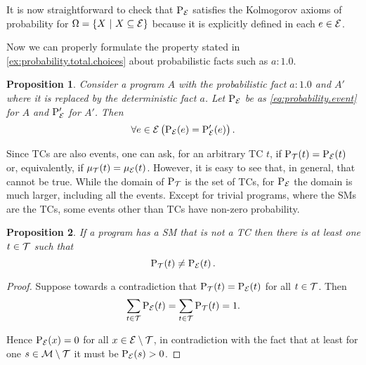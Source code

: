 \documentclass{tlp}
\newtheorem{proposition}{Proposition}
\newcommand{\at}[1]{\ensuremath{\!\del{#1}}}        %
\newcommand{\cla}[1]{\ensuremath{{\cal #1}}}        %
\newcommand{\TCHOICEset}{\ensuremath{\cla{T}}}
\newcommand{\MODELset}{\ensuremath{\cla{M}}}
\newcommand{\EVENTSset}{\ensuremath{\cla{E}}}
\newcommand{\prfunc}{\ensuremath{\mathrm{P}}}
\newcommand{\prd}[1]{\ensuremath{\prfunc_{#1}}}
\newcommand{\prT}{\prd{\TCHOICEset}}
\newcommand{\prE}{\prd{\EVENTSset}}
\newcommand{\pwT}{\ensuremath{\mu_{\TCHOICEset}}}
\newcommand{\pwt}[1]{\ensuremath{\pwT\at{#1}}}
\newcommand{\pwE}{\ensuremath{\mu_{\EVENTSset}}}
\newcommand{\pwe}[1]{\ensuremath{\pwE\at{#1}}}
\newcommand{\given}{\ensuremath{~\middle|~}}
\newcommand{\probfact}[2]{\ensuremath{#1:#2}}
\newcommand{\franc}[1]{{\color{green!30!black}#1}}
\begin{document}
It is now straightforward to check that \(\prE\) satisfies the
Kolmogorov axioms of probability for
\(\Omega = \set{X \given X \subseteq \EVENTSset}\) because it is
explicitly defined in each \(e\in\EVENTSset\).

\franc{ Now we can properly formulate the property stated in
  \cref{ex:probability.total.choices} about probabilistic facts such
  as \(\probfact{a}{1.0}\).
    \begin{proposition}\label{prop:prob.one}
        Consider a program $A$ with the probabilistic fact \(\probfact{a}{1.0}\) and $A'$ where it is replaced by the deterministic fact \(a\).  Let \(\prE\) be as \cref{eq:probability.event} for $A$ and \(\prfunc'_{\EVENTSset}\) for $A'$.  Then
        \begin{equation}
            \forall e \in \EVENTSset \left(\prE\at{e} = \prfunc'_{\EVENTSset}\at{e}\right).
        \end{equation}
    \end{proposition}
}

Since \aclp{TC} are also events, one can ask, for an arbitrary
\acl{TC} \(t\), if \(\prT\at{t} = \prE\at{t}\) or, equivalently, if
\(\pwt{t} = \pwe{t}\).  However, it is easy to see that, in general,
that cannot be true.  While the domain of \(\prT\) is the set of
\aclp{TC}, for \(\prE\) the domain is much larger, including all the
events.  Except for trivial programs, where the \acp{SM} are the
\acp{TC}, some events other than \aclp{TC} have non-zero probability.

\begin{proposition} \label{prop:two.distributions} %
    If a program has a \acl{SM} that is not a \acl{TC} then there is at least one \(t\in\TCHOICEset\) such that
    \begin{equation}
        \prT\at{t} \not= \prE\at{t}. \label{eq:two.distributions}
    \end{equation}
\end{proposition}

\begin{proof}
    Suppose towards a contradiction that \(\prT\at{t} = \prE\at{t}\) for all \(t \in \TCHOICEset\).  Then \[
        \sum_{t\in\TCHOICEset} \prE\at{t} = \sum_{t\in\TCHOICEset} \prT\at{t} = 1.
    \]

    Hence \(\prE\at{x} = 0\) for all
    \(x \in \EVENTSset\setminus\TCHOICEset\), in contradiction with
    the fact that at least for one
    \(s \in \MODELset\setminus\TCHOICEset\) it must be
    \(\prE\at{s} > 0\).
\end{proof}
\end{document}
